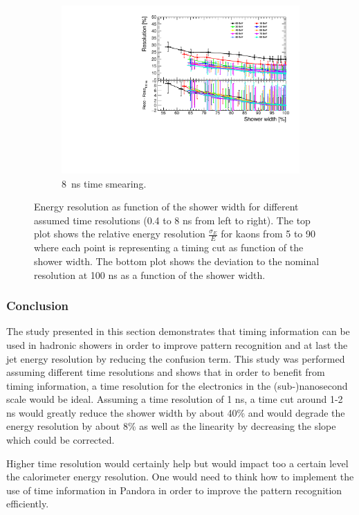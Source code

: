 \begin{figure}[htbp!]
\begin{subfigure}[t]{0.48\textwidth}
    \centering
    \includegraphics[width=1\linewidth]{../Thesis_Plots/ILD/Smearing_8ns/Plots/ShowerWidth_Resolution_Smearing3}
    \caption{\SI{8}{\nano\second} time smearing.}  \label{fig:WidthReso8ns}
  \end{subfigure}
  \caption{Energy resolution as function of the shower width for different assumed time resolutions (0.4 to 8 ns from left to right). The top plot shows the relative energy resolution $\frac{\sigma_{E}}{E}$ for kaons from 5 to 90 \GeV where each point is representing a timing cut as function of the shower width. The bottom plot shows the deviation to the nominal resolution at 100 ns as a function of the shower width.}
\end{figure}

\subsubsection{Conclusion}

The study presented in this section demonstrates that timing information can be used in hadronic showers in order to improve pattern recognition and at last the jet energy resolution by reducing the confusion term. This study was performed assuming different time resolutions and shows that in order to benefit from timing information, a time resolution for the electronics in the (sub-)nanosecond scale would be ideal. Assuming a time resolution of 1 ns, a time cut around 1-2 ns would greatly reduce the shower width by about 40\% and would degrade the energy resolution by about 8\% as well as the linearity by decreasing the slope which could be corrected.

Higher time resolution would certainly help but would impact too a certain level the calorimeter energy resolution. One would need to think how to implement the use of time information in Pandora in order to improve the pattern recognition efficiently.
